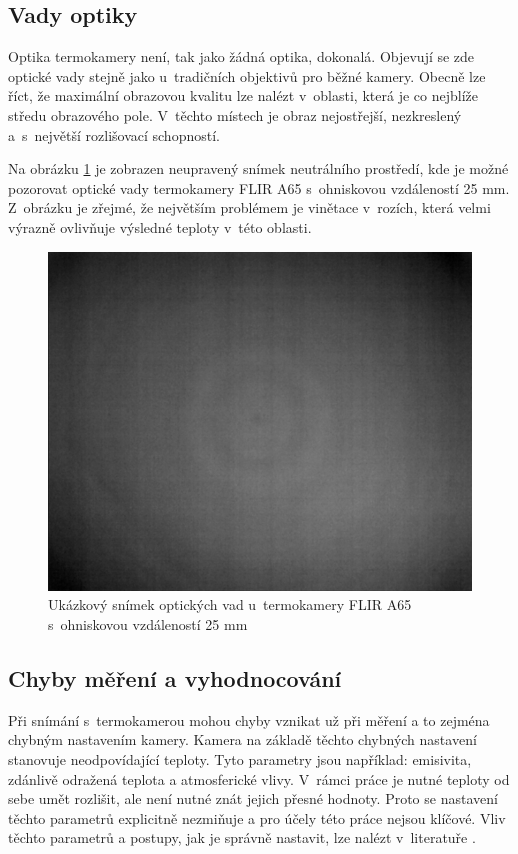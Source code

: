   	\subsection{Vady optiky}\label{section:lens_deffects}
    Optika termokamery není, tak jako žádná optika, dokonalá. Objevují se zde optické vady stejně jako u~tradičních objektivů pro běžné kamery. Obecně lze říct, že maximální obrazovou kvalitu lze nalézt v~oblasti, která je co nejblíže středu obrazového pole. V~těchto místech je obraz nejostřejší, nezkreslený a~s~největší rozlišovací schopností. 
    
    Na obrázku \ref{fig:camera_2_lens_deffects} je zobrazen neupravený snímek neutrálního prostředí, kde je možné pozorovat optické vady termokamery FLIR A65 s~ohniskovou vzdáleností 25 mm. Z~obrázku je zřejmé, že největším problémem je vinětace v~rozích, která velmi výrazně ovlivňuje výsledné teploty v~této oblasti.
     
    \begin{figure}[h]
      \centering
      \includegraphics[width=1\textwidth]{images/camera_2_lens_deffects.jpg}
      \caption{Ukázkový snímek optických vad u~termokamery  FLIR A65 s~ohniskovou vzdáleností 25 mm}
      \label{fig:camera_2_lens_deffects}
    \end{figure}  

	\subsection{Chyby měření a vyhodnocování}
    Při snímání s~termokamerou mohou chyby vznikat už při měření a to zejména chybným nastavením kamery. Kamera na základě těchto chybných nastavení stanovuje neodpovídající teploty. Tyto parametry jsou například: emisivita, zdánlivě odražená teplota a atmosferické vlivy. V~rámci práce je nutné teploty od sebe umět rozlišit, ale není nutné znát jejich přesné hodnoty. Proto se nastavení těchto parametrů explicitně nezmiňuje a pro účely této práce nejsou klíčové. Vliv těchto parametrů a postupy, jak je správně nastavit, lze nalézt v~literatuře \cite{flirA65Spec,puhl2015bezkontaktni,smrvz2013bezkontaktni,kuvzel2010bezkontaktni}.

